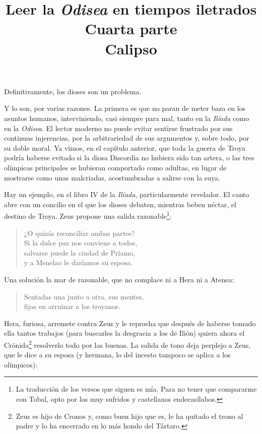 \documentclass[11pt,a4paper]{article}
\title{Leer la \emph{Odisea} en tiempos iletrados \\ Cuarta parte \\ Calipso}
\author{}
\date{}
\begin{document}
\maketitle

Definitivamente, los dioses son un problema.

Y lo son, por varias razones. La primera es que no paran de meter baza en los asuntos humanos, interviniendo, casi siempre para mal, tanto en la \emph{Ilíada} como en la \emph{Odisea}. El lector moderno no puede evitar sentirse frustrado por sus continuas injerencias, por la arbitrariedad de sus argumentos y, sobre todo, por su doble moral. Ya vimos, en el capítulo anterior, que toda la guerra de Troya podría haberse evitado si la diosa Discordia no hubiera sido tan artera, o las tres olímpicas principales se hubieran comportado como adultas, en lugar de mostrarse como unas malcriadas, acostumbradas a salirse con la suya.

Hay un ejemplo, en el libro IV de la \emph{Ilíada}, particularmente revelador. El canto abre con un concilio en el que los dioses debaten, mientras beben néctar, el destino de Troya. Zeus propone una salida razonable\footnote{La traducción de los versos que siguen es mía. Para no tener que compararme con Tobal, opto por los muy sufridos y castellanos endecasílabos.}:

\begin{verse}
¿O quizás reconciliar ambas partes?\\
Si la dulce paz nos conviene a todos,\\
salvarse puede la ciudad de Príamo,\\
y a Menelao le daríamos su esposa.
\end{verse}

Una solución la mar de razonable, que no complace ni a Hera ni a Atenea:

\begin{verse}
Sentadas una junto a otra, sus mentes,\\
fijas en arruinar a los troyanos.
\end{verse}

Hera, furiosa, arremete contra Zeus y le reprocha que después de haberse tomado ella tantos trabajos (para buscarles la desgracia a los de Ilión) quiera ahora el Crónida\footnote{Zeus es hijo de Cronos y, como buen hijo que es, le ha quitado el trono al padre y lo ha encerrado en lo más hondo del Tártaro.} resolverlo todo por las buenas. La salida de tono deja perplejo a Zeus, que le dice a su esposa (y hermana, lo del incesto tampoco se aplica a los olímpicos):
\end{document}
